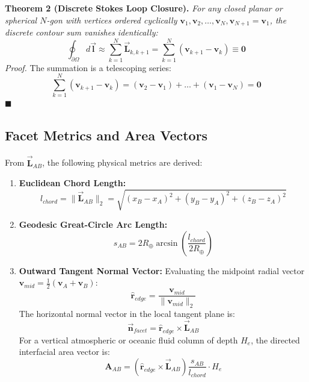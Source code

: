 \documentclass[10pt,journal,compsoc]{IEEEtran}
\begin{document}
\textbf{Theorem 2 (Discrete Stokes Loop Closure).} \textit{For any closed planar or spherical $N$-gon with vertices ordered cyclically $\mathbf{v}_1, \mathbf{v}_2, \dots, \mathbf{v}_N, \mathbf{v}_{N+1} = \mathbf{v}_1$, the discrete contour sum vanishes identically:}
\begin{equation}
\oint_{\partial \Omega} d\vec{\mathbf{l}} \approx \sum_{k=1}^N \vec{\mathbf{L}}_{k, k+1} = \sum_{k=1}^N (\mathbf{v}_{k+1} - \mathbf{v}_k) \equiv \mathbf{0}
\end{equation}
\textit{Proof.} The summation is a telescoping series:
\begin{equation}
\sum_{k=1}^N (\mathbf{v}_{k+1} - \mathbf{v}_k) = (\mathbf{v}_2 - \mathbf{v}_1) + \dots + (\mathbf{v}_1 - \mathbf{v}_N) = \mathbf{0}
\end{equation}
$\blacksquare$

\subsection{Facet Metrics and Area Vectors}
From $\vec{\mathbf{L}}_{AB}$, the following physical metrics are derived:
\begin{enumerate}
    \item \textbf{Euclidean Chord Length:}
    \begin{equation}
    l_{chord} = \|\vec{\mathbf{L}}_{AB}\|_2 = \sqrt{(x_B - x_A)^2 + (y_B - y_A)^2 + (z_B - z_A)^2}
    \end{equation}
    \item \textbf{Geodesic Great-Circle Arc Length:}
    \begin{equation}
    s_{AB} = 2 R_{\oplus} \arcsin\left(\frac{l_{chord}}{2 R_{\oplus}}\right)
    \end{equation}
    \item \textbf{Outward Tangent Normal Vector:}
    Evaluating the midpoint radial vector $\mathbf{v}_{mid} = \frac{1}{2}(\mathbf{v}_A + \mathbf{v}_B)$:
    \begin{equation}
    \hat{\mathbf{r}}_{edge} = \frac{\mathbf{v}_{mid}}{\|\mathbf{v}_{mid}\|_2}
    \end{equation}
    The horizontal normal vector in the local tangent plane is:
    \begin{equation}
    \vec{\mathbf{n}}_{facet} = \hat{\mathbf{r}}_{edge} \times \vec{\mathbf{L}}_{AB}
    \end{equation}
    For a vertical atmospheric or oceanic fluid column of depth $H_e$, the directed interfacial area vector is:
    \begin{equation}
    \mathbf{A}_{AB} = \left(\hat{\mathbf{r}}_{edge} \times \vec{\mathbf{L}}_{AB}\right) \frac{s_{AB}}{l_{chord}} \cdot H_e
    \end{equation}
\end{enumerate}
\end{document}
